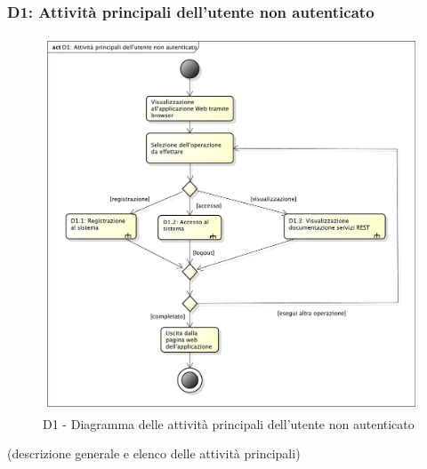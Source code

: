 		\subsubsection{D1: Attività principali dell'utente non autenticato} %
		\label{ssub:attivita_principali_dell_utente_non_autenticato}
		\begin{figure}[!htbp]
			\centering
			\centerline{\includegraphics[scale=0.40]{./images/D1.pdf}}
			\caption{D1 - Diagramma delle attività principali dell'utente non autenticato}
		\end{figure}
		\noindent
		[TO DO] (descrizione generale e elenco delle attività principali)


